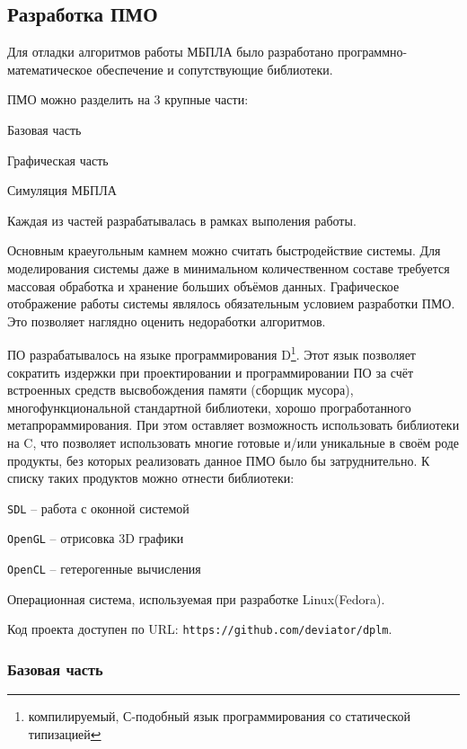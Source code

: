 \subsection{Разработка ПМО}

Для отладки алгоритмов работы МБПЛА было разработано
программно-математическое обеспечение и сопутствующие библиотеки.

ПМО можно разделить на 3 крупные части:

\begin{mintemize}
\item Базовая часть
\item Графическая часть
\item Симуляция МБПЛА
\end{mintemize}

Каждая из частей разрабатывалась в рамках выполения работы.

Основным краеугольным камнем можно считать быстродействие системы.
Для моделирования системы даже в минимальном количественном составе
требуется массовая обработка и хранение больших объёмов данных. Графическое
отображение работы системы являлось обязательным условием разработки ПМО.
Это позволяет наглядно оценить недоработки алгоритмов.

ПО разрабатывалось на языке программирования D\footnote{компилируемый, С-подобный
язык программирования со статической типизацией}. Этот язык позволяет сократить
издержки при проектировании и программировании ПО за счёт встроенных средств
высвобождения памяти (сборщик мусора), многофункциональной стандартной
библиотеки, хорошо програботанного метапрораммирования. При этом оставляет
возможность использовать библиотеки на C, что позволяет использовать
многие готовые и/или уникальные в своём роде продукты, без которых
реализовать данное ПМО было бы затруднительно. К списку таких продуктов
можно отнести библиотеки:

\begin{mintemize}
\item \verb|SDL| -- работа с оконной системой
\item \verb|OpenGL| -- отрисовка 3D графики
\item \verb|OpenCL| -- гетерогенные вычисления
\end{mintemize}

Операционная система, используемая при разработке Linux(Fedora).

Код проекта доступен по URL: \verb|https://github.com/deviator/dplm|.

\newpage
\subsubsection{Базовая часть}

